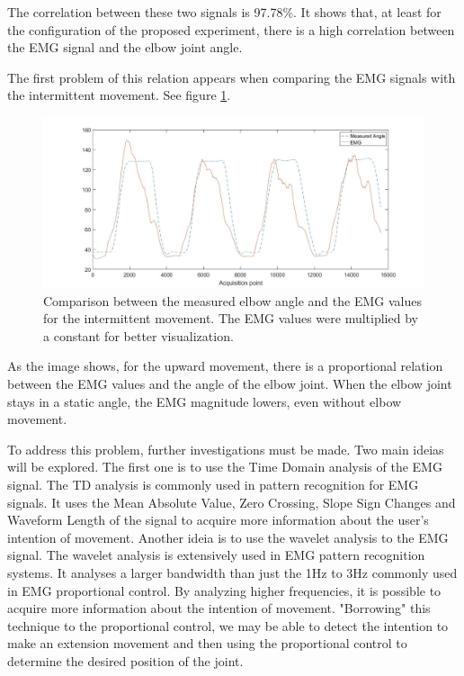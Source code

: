    The correlation between these two signals is 97.78\%. It shows that, at least for the configuration of the proposed experiment, there is a high correlation between the EMG signal and the elbow joint angle.
   
   The first problem of this relation appears when comparing the EMG signals with the intermittent movement. See figure \ref{EmgAngleInt}.

\begin{figure}[thpb]
      \centering
      \includegraphics[scale=0.35]{Images/EmgAngleInt.jpg}
      \caption{Comparison between the measured elbow angle and the EMG values for the intermittent movement. The EMG values were multiplied by a constant for better visualization.}
      \label{EmgAngleInt}
   \end{figure}
   
   As the image shows, for the upward movement, there is a proportional relation between the EMG values and the angle of the elbow joint. When the elbow joint stays in a static angle, the EMG magnitude lowers, even without elbow movement. 
   
   
   To address this problem, further investigations must be made. Two main ideias will be explored. The first one is to use the Time Domain analysis of the EMG signal. The TD analysis is commonly used in pattern recognition for EMG signals. It uses the Mean Absolute Value,
Zero Crossing, Slope Sign Changes and Waveform Length of the signal to acquire more information about the user's intention of movement. Another ideia is to use the wavelet analysis to the EMG signal. The wavelet analysis is extensively used in EMG pattern recognition systems. It analyses a larger bandwidth than just the 1Hz to 3Hz commonly used in EMG proportional control. By analyzing higher frequencies, it is possible to acquire more information about the intention of movement. "Borrowing" this technique to the proportional control, we may be able to detect the intention to make an extension movement and then using the proportional control to determine the desired position of the joint.